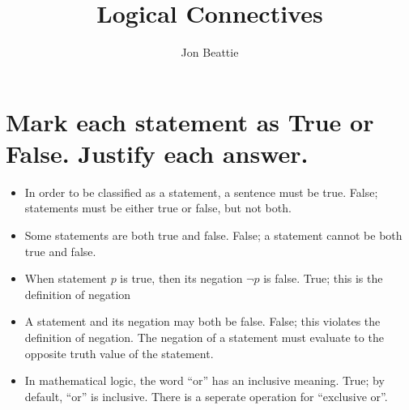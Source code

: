 \documentclass[11pt]{article} %
\title{Logical Connectives}
\author{Jon Beattie}
\begin{document}
\maketitle

\section{Mark each statement as True or False. Justify each answer.}
\begin{itemize}
	\item In order to be classified as a statement, a sentence must be true.
	\subitem False; statements must be either true or false, but not both.
	
	\item Some statements are both true and false.
	\subitem False; a statement cannot be both true and false.
	
	\item When statement $p$ is true, then its negation $\neg p$ is false.
	\subitem True; this is the definition of negation
	
	\item A statement and its negation may both be false.
	\subitem False; this violates the definition of negation. The negation of a statement must evaluate to the opposite truth value of the statement.
	
	\item In mathematical logic, the word ``or'' has an inclusive meaning.
	\subitem True; by default, ``or'' is inclusive. There is a seperate operation for ``exclusive or''.
\end{itemize}
\end{document}
